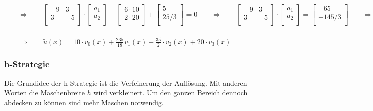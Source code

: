 $\qquad\Rightarrow\qquad
\begin{bmatrix}
	-9 & 3\\
	3 & -5\\
\end{bmatrix}\cdot
\begin{bmatrix}
	a_1\\
	a_2\\
\end{bmatrix}+
\begin{bmatrix}
	6\cdot 10\\
	2\cdot 20\\
\end{bmatrix}+
\begin{bmatrix}
	5\\
	25/3\\
\end{bmatrix}
=0\qquad\Rightarrow\qquad
\begin{bmatrix}
	-9 & 3\\
	3 & -5\\
\end{bmatrix}\cdot
\begin{bmatrix}
	a_1\\
	a_2\\
\end{bmatrix}=
\begin{bmatrix}
	-65\\
	-145/3\\
\end{bmatrix}\qquad\Rightarrow\qquad
\begin{bmatrix}
	a_1\\
	a_2\\
\end{bmatrix}=
\begin{bmatrix}
	235/18\\
	35/2\\
\end{bmatrix}
$\\
\\
$
\qquad\Rightarrow\qquad \tilde{u}(x)=10\cdot v_0(x)+\frac{235}{18} v_1(x)+\frac{35}{2}\cdot v_2(x)+20\cdot v_3(x)=
$




\subsubsection{h-Strategie}

Die Grundidee der h-Strategie ist die Verfeinerung der Auflösung. Mit anderen Worten die Maschenbreite $h$ wird verkleinert. Um den ganzen Bereich dennoch abdecken zu können sind mehr Maschen notwendig.

